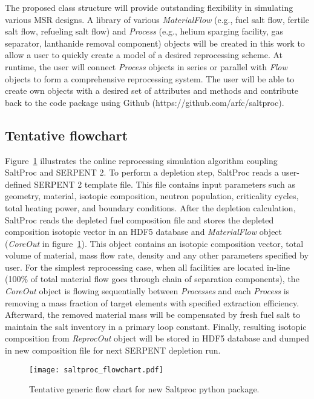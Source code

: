 The proposed class structure will provide outstanding flexibility in simulating 
various \gls{MSR} designs. A library of various \textit{MaterialFlow} (e.g., 
fuel salt flow, fertile salt flow, refueling salt flow) and \textit{Process} 
(e.g., helium sparging facility, gas separator, lanthanide removal component) 
objects will be created in this work to allow a user to quickly create a model 
of a desired reprocessing scheme. At runtime, the user will connect 
\textit{Process} objects in series or parallel with \textit{Flow} objects to 
form a comprehensive reprocessing system. The user will be able to create 
own objects with a desired set of attributes and methods and contribute back 
to the code package using Github (https://github.com/arfc/saltproc).	

\subsection{Tentative flowchart}
Figure~\ref{fig:saltproc_flow} illustrates the online reprocessing simulation 
algorithm coupling SaltProc and SERPENT 2. To perform a depletion step, 
SaltProc reads a user-defined SERPENT 2 template file. This file contains input 
 parameters such as geometry, material, isotopic composition, neutron 
population, criticality cycles, total heating power, and boundary conditions.  
After the depletion calculation, SaltProc reads the depleted fuel composition 
file and stores the depleted composition isotopic vector in an HDF5 database 
and \textit{MaterialFlow} object (\textit{CoreOut} in 
figure~\ref{fig:saltproc_flow}). This object contains an isotopic composition 
vector, total volume of material, mass flow rate, density and any other 
parameters specified by user. For the simplest reprocessing case, when all 
facilities are located in-line (100\% of total material flow goes through 
chain of separation components), the \textit{CoreOut} object is flowing 
sequentially between \textit{Processes} and each \textit{Process} is 
removing a mass fraction of target elements with specified extraction 
efficiency. Afterward, the removed material mass will be compensated by 
fresh fuel salt to maintain the salt inventory in a primary loop constant. 
Finally, resulting isotopic composition from \textit{ReprocOut} object will 
be stored in HDF5 database and dumped in new composition file for next 
SERPENT depletion run. 
\begin{figure}[ht!] %
  \texttt{[image: saltproc\_flowchart.pdf]}
  \caption{Tentative generic flow chart for new Saltproc python package.}
  \label{fig:saltproc_flow}
\end{figure}

